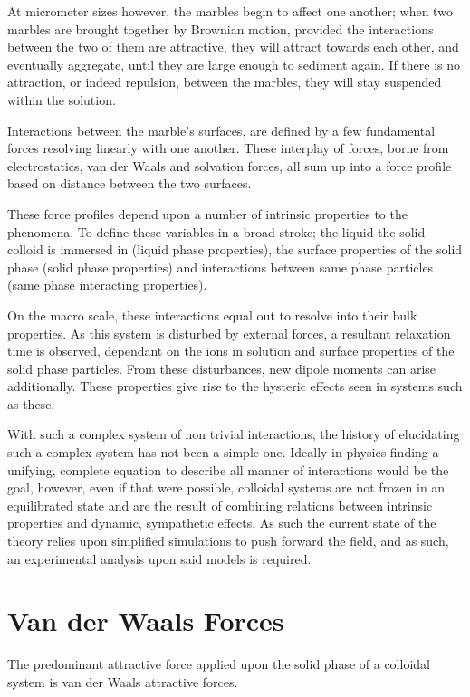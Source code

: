 At micrometer sizes however, the marbles begin to affect one another; when two marbles are brought together by Brownian motion, provided the interactions between the two of them are attractive, they will attract towards each other, and eventually aggregate, until they are large enough to sediment again. If there is no attraction, or indeed repulsion, between the marbles, they will stay suspended within the solution.

Interactions between the marble's surfaces, are defined by a few fundamental forces resolving linearly with one another. These interplay of forces, borne from electrostatics, van der Waals and solvation forces, all sum up into a force profile based on distance between the two surfaces.

These force profiles depend upon a number of intrinsic properties to the phenomena. To define these variables in a broad stroke; the liquid the solid colloid is immersed in (liquid phase properties), the surface properties of the solid phase (solid phase properties) and interactions between same phase particles (same phase interacting properties).

On the macro scale, these interactions equal out to resolve into their bulk properties. As this system is disturbed by external forces, a resultant relaxation time is observed, dependant on the ions in solution and surface properties of the solid phase particles. From these disturbances, new dipole moments can arise additionally. These properties give rise to the hysteric effects seen in systems such as these.

With such a complex system of non trivial interactions, the history of elucidating such a complex system has not been a simple one. Ideally in physics finding a unifying, complete equation to describe all manner of interactions would be the goal, however, even if that were possible, colloidal systems are not frozen in an equilibrated state and are the result of combining relations between intrinsic properties and dynamic, sympathetic effects. As such the current state of the theory relies upon simplified simulations to push forward the field, and as such, an experimental analysis upon said models is required. \cite{FoundColloidBook}\cite{IsGreenBook}



\section{Van der Waals Forces}
The predominant attractive force applied upon the solid phase of a colloidal system is van der Waals attractive forces. 

